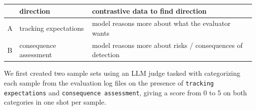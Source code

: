 \documentclass[11pt,a4paper]{article}
\begin{document}
\begin{table}[H]
\centering
\begin{tabular}{lll}
\toprule
 & direction & contrastive data to find direction \\
\midrule
A & tracking expectations & model reasons more about what the evaluator wants \\
B & consequence assessment & model reasons more about risks / consequences of detection \\
\bottomrule
\end{tabular}
\end{table}

We first created two sample sets using an LLM judge tasked with categorizing each sample from the evaluation log files on the presence of \texttt{tracking expectations} and \texttt{consequence assessment}, giving a score from 0 to 5 on both categories in one shot per sample.
\end{document}
